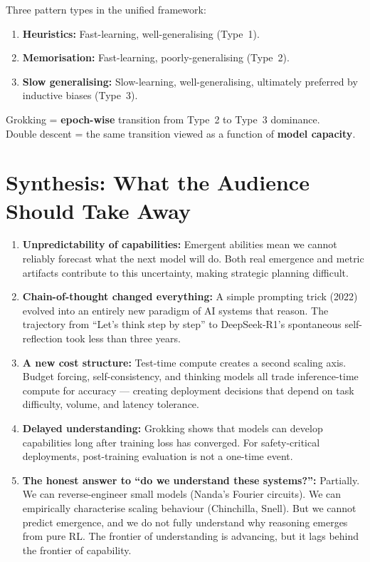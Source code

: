 \documentclass[11pt, a4paper]{article}
\theoremstyle{definition}
\theoremstyle{plain}
\begin{document}
Three pattern types in the unified framework:
\begin{enumerate}
  \item \textbf{Heuristics:} Fast-learning, well-generalising (Type~1).
  \item \textbf{Memorisation:} Fast-learning, poorly-generalising (Type~2).
  \item \textbf{Slow generalising:} Slow-learning, well-generalising, ultimately preferred by inductive biases (Type~3).
\end{enumerate}

Grokking = \textbf{epoch-wise} transition from Type~2 to Type~3 dominance.\\
Double descent = the same transition viewed as a function of \textbf{model capacity}.


\section{Synthesis: What the Audience Should Take Away}

\begin{enumerate}
  \item \textbf{Unpredictability of capabilities:} Emergent abilities mean we cannot reliably forecast what the next model will do. Both real emergence and metric artifacts contribute to this uncertainty, making strategic planning difficult.
  \item \textbf{Chain-of-thought changed everything:} A simple prompting trick (2022) evolved into an entirely new paradigm of AI systems that reason. The trajectory from ``Let's think step by step'' to DeepSeek-R1's spontaneous self-reflection took less than three years.
  \item \textbf{A new cost structure:} Test-time compute creates a second scaling axis. Budget forcing, self-consistency, and thinking models all trade inference-time compute for accuracy --- creating deployment decisions that depend on task difficulty, volume, and latency tolerance.
  \item \textbf{Delayed understanding:} Grokking shows that models can develop capabilities long after training loss has converged. For safety-critical deployments, post-training evaluation is not a one-time event.
  \item \textbf{The honest answer to ``do we understand these systems?'':} Partially. We can reverse-engineer small models (Nanda's Fourier circuits). We can empirically characterise scaling behaviour (Chinchilla, Snell). But we cannot predict emergence, and we do not fully understand why reasoning emerges from pure RL. The frontier of understanding is advancing, but it lags behind the frontier of capability.
\end{enumerate}
\end{document}
